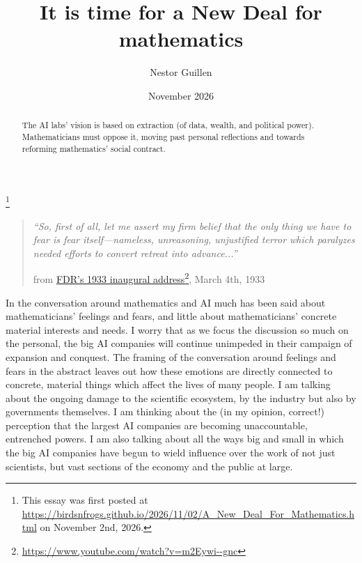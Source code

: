 \documentclass[11pt]{amsart}
\begin{document}
\title{It is time for a New Deal for mathematics}
\author{Nestor Guillen}
\date{November 2026}
\thanks{This essay was first posted at \url{https://birdsnfrogs.github.io/2026/11/02/A_New_Deal_For_Mathematics.html} on November 2nd, 2026.}
\begin{abstract}The AI labs' vision is based on extraction (of data, wealth, and political power). Mathematicians must oppose it, moving past personal reflections and towards reforming mathematics' social contract.\end{abstract}
\maketitle


\begin{quote}\itshape ``So, first of all, let me assert my firm belief that the only thing we have to fear is fear itself---nameless, unreasoning, unjustified terror which paralyzes needed efforts to convert retreat into advance...''\par\medskip\normalfont\small\raggedleft from \href{https://www.youtube.com/watch?v=m2Eywi--gnc}{FDR's 1933 inaugural address}\footnote{\url{https://www.youtube.com/watch?v=m2Eywi--gnc}}, March 4th, 1933\par\end{quote}

In the conversation around mathematics and AI much has been said about mathematicians' feelings and fears, and little about mathematicians' concrete material interests and needs. I worry that as we focus the discussion so much on the personal, the big AI companies will continue unimpeded in their campaign of expansion and conquest. The framing of the conversation around feelings and fears in the abstract leaves out how these emotions are directly connected to concrete, material things which affect the lives of many people. I am talking about the ongoing damage to the scientific ecosystem, by the industry but also by governments themselves. I am thinking about the (in my opinion, correct!) perception that the largest AI companies are becoming unaccountable, entrenched powers. I am also talking about all the ways big and small in which the big AI companies have begun to wield influence over the work of not just scientists, but vast sections of the economy and the public at large.
\end{document}

